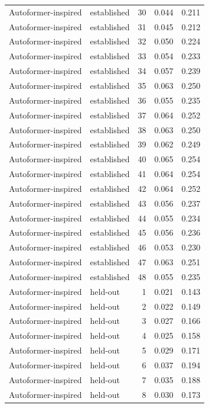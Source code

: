 \begin{tabular}{llrrr}
Autoformer-inspired & established & 30 & 0.044 & 0.211 \\
Autoformer-inspired & established & 31 & 0.045 & 0.212 \\
Autoformer-inspired & established & 32 & 0.050 & 0.224 \\
Autoformer-inspired & established & 33 & 0.054 & 0.233 \\
Autoformer-inspired & established & 34 & 0.057 & 0.239 \\
Autoformer-inspired & established & 35 & 0.063 & 0.250 \\
Autoformer-inspired & established & 36 & 0.055 & 0.235 \\
Autoformer-inspired & established & 37 & 0.064 & 0.252 \\
Autoformer-inspired & established & 38 & 0.063 & 0.250 \\
Autoformer-inspired & established & 39 & 0.062 & 0.249 \\
Autoformer-inspired & established & 40 & 0.065 & 0.254 \\
Autoformer-inspired & established & 41 & 0.064 & 0.254 \\
Autoformer-inspired & established & 42 & 0.064 & 0.252 \\
Autoformer-inspired & established & 43 & 0.056 & 0.237 \\
Autoformer-inspired & established & 44 & 0.055 & 0.234 \\
Autoformer-inspired & established & 45 & 0.056 & 0.236 \\
Autoformer-inspired & established & 46 & 0.053 & 0.230 \\
Autoformer-inspired & established & 47 & 0.063 & 0.251 \\
Autoformer-inspired & established & 48 & 0.055 & 0.235 \\
Autoformer-inspired & held-out & 1 & 0.021 & 0.143 \\
Autoformer-inspired & held-out & 2 & 0.022 & 0.149 \\
Autoformer-inspired & held-out & 3 & 0.027 & 0.166 \\
Autoformer-inspired & held-out & 4 & 0.025 & 0.158 \\
Autoformer-inspired & held-out & 5 & 0.029 & 0.171 \\
Autoformer-inspired & held-out & 6 & 0.037 & 0.194 \\
Autoformer-inspired & held-out & 7 & 0.035 & 0.188 \\
Autoformer-inspired & held-out & 8 & 0.030 & 0.173 \\

\end{tabular}
